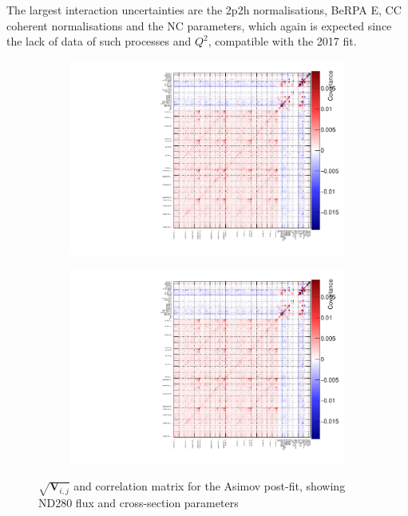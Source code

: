 The largest interaction uncertainties are the 2p2h normalisations, BeRPA E, CC coherent normalisations and the NC parameters, which again is expected since the lack of data of such processes and $Q^2$, compatible with the 2017 fit.
\begin{figure}[h]
	\begin{subfigure}[t]{0.49\textwidth}
		\includegraphics[width=\textwidth, trim={0mm 0mm 0mm 0mm}, clip,page=5]{figures/mach3/2018/asimov/corr/2018a_MultiPi_Binningv6_NewCov_Asimov_merge_drawCorr}
	\end{subfigure}
	\begin{subfigure}[t]{0.49\textwidth}
		\includegraphics[width=\textwidth, trim={0mm 0mm 0mm 0mm}, clip,page=6]{figures/mach3/2018/asimov/corr/2018a_MultiPi_Binningv6_NewCov_Asimov_merge_drawCorr}
	\end{subfigure}
	\caption{$\sqrt{\mathbf{V}_{i,j}}$ and correlation matrix for the Asimov post-fit, showing ND280 flux and cross-section parameters}
	\label{fig:asimov_nd_corr_2018}
\end{figure}

